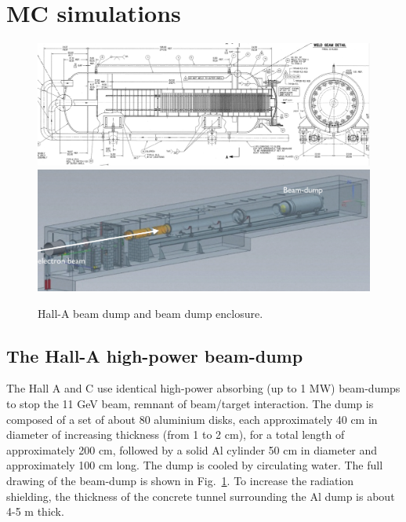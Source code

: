 \section{MC simulations}
\label{sec:sim}
\begin{figure}[h!] 
\center
\includegraphics[width=12.5cm]{figs/beam-dump-br.pdf}
\includegraphics[width=12.5cm]{figs/beam-dump.pdf}
\caption{Hall-A beam dump and beam dump enclosure. }
\label{fig:bd}
\end{figure}
\subsection{The Hall-A high-power beam-dump}
The Hall A and C use identical high-power absorbing (up to 1 MW)  beam-dumps to stop the 11 GeV beam, remnant of beam/target interaction. The dump is 
composed of a set of about 80 aluminium disks, each
approximately 40 cm in diameter of increasing thickness (from 1 to 2 cm), for a total
length of approximately 200 cm, followed by a solid Al cylinder 50 cm in diameter
and approximately 100 cm long. The dump is cooled by circulating water. The full
drawing of the beam-dump is shown in Fig.~\ref{fig:bd}. To increase the radiation shielding,
the thickness of the concrete tunnel surrounding the Al dump is about 4-5 m thick.


